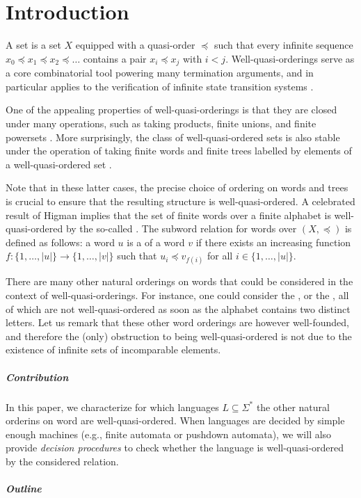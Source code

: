 \section{Introduction}
\label{introduction:sec}

A  set is a set $X$ equipped with a quasi-order
$\preceq$ such that every infinite sequence $x_0 \preceq x_1 \preceq x_2
\preceq \ldots$ contains a pair $x_i \preceq x_j$ with $i < j$.
Well-quasi-orderings serve as a core combinatorial tool powering many
termination arguments, and in particular applies to the verification of
infinite state transition systems \cite{ABDU96,ABDU98}.

One of the appealing properties of well-quasi-orderings is that they are closed
under many operations, such as taking products, finite unions, and finite
powersets \cite{SCSC12}. More surprisingly, the class of well-quasi-ordered
sets is also stable under the operation of taking finite words and finite trees
labelled by elements of a well-quasi-ordered set \cite{HIG52,KRU72}. 

Note that in these latter cases, the precise choice of ordering on words and
trees is crucial to ensure that the resulting structure is well-quasi-ordered.
A celebrated result of Higman implies that the set of finite words over a
finite alphabet is well-quasi-ordered by the so-called 
\cite{HIG52}. The subword relation for words over $(X, \preceq)$ is defined as
follows: a word $u$ is a  of a word $v$ if there exists an
increasing function $f \colon \{1, \ldots, |u|\} \to \{1, \ldots, |v|\}$ such
that $u_i \preceq v_{f(i)}$ for all $i \in \{1, \ldots, |u|\}$.

There are many other natural orderings on words that could be considered in the
context of well-quasi-orderings. For instance, one could consider the
,  or the , all of
which are not well-quasi-ordered as soon as the alphabet contains two distinct
letters. Let us remark that these other word orderings are however
well-founded, and therefore the (only) obstruction to being well-quasi-ordered
is not due to the existence of infinite sets of incomparable elements.


\subparagraph{Contribution} In this paper, we characterize for which languages
$L \subseteq \Sigma^*$ the other natural orderins on word are
well-quasi-ordered. When languages are decided by simple enough machines (e.g.,
finite automata or pushdown automata), we will also provide \emph{decision
procedures} to check whether the language is well-quasi-ordered by the
considered relation. 

\subparagraph{Outline}
